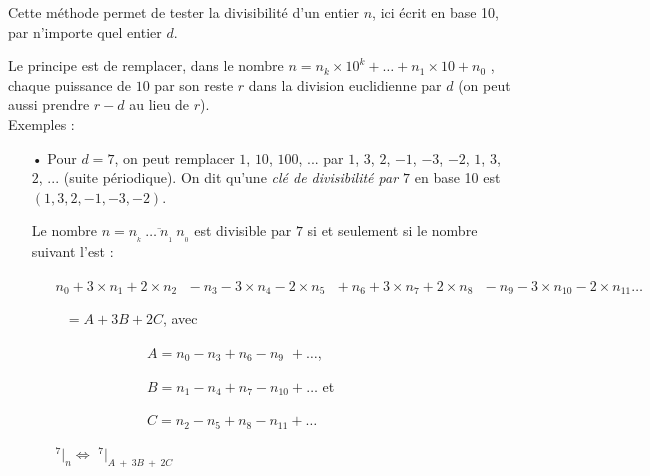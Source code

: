 \documentclass[a4paper]{article}
\begin{document}
Cette méthode permet de tester la divisibilité d'un entier $n$, ici écrit en base 10, par n'importe quel entier $d$.

Le principe est de remplacer, dans le nombre $n = n_k\times10^k + \dots + n_1\times10 + n_0$ , chaque puissance de $10$ par son reste $r$ dans la division euclidienne par $d$ (on peut aussi prendre $r - d$ au lieu de $r$).\\

{ \parindent=0.5cm Exemples : }

\begin{small}
\begin{itemize}

	\item[•] Pour $d = 7$, on peut remplacer $1$, $10$, $100$, ... par $1$, $3$, $2$, $-1$, $-3$, $-2$, $1$, $3$, $2$, ... (suite périodique). On dit qu'une \textit{clé de divisibilité par $7$} en base 10 est $(1, 3, 2, -1, -3, -2)$.
	
	\vspace{0.2cm}
	
	Le nombre $n = \overline{n_{_{k}}~\dots~n_{_1}~n_{_0}}$ est divisible par $7$ si et seulement si le nombre suivant l'est :
	
	\vspace{0.2cm}
	
	\begin{itemize}
		\item[] $n_0 + 3 \times n_1 + 2 \times n_2 ~~~ - n_3 - 3 \times n_4 - 2 \times n_5 ~~~ + n_6 + 3 \times n_7 + 2 \times n_8 ~~~ - n_9 - 3 \times n_{10} - 2 \times n_{11}\dots$ 
		\item[] $~~~ = A + 3B + 2C$, avec 
		
		\begin{itemize}
			\item[] ~~~~~~~~~ $A = n_0 - n_3 + n_6 - n_{9\phantom{0}}    + \dots$, 
			\item[] ~~~~~~~~~ $B = n_1 - n_4 + n_7 - n_{10} + \dots$ 	et  	
			\item[] ~~~~~~~~~ $C = n_2 - n_5 + n_8 - n_{11} + \dots$
		\end{itemize}
		
		\vspace{0.2cm}		
		
		\item[] {\Large $ ^{7}|_n \Leftrightarrow$ $^{7}|_{A~+~3B~+~2C} $}\\
		
	\end{itemize}
	

\end{itemize}
\end{small}
\end{document}

